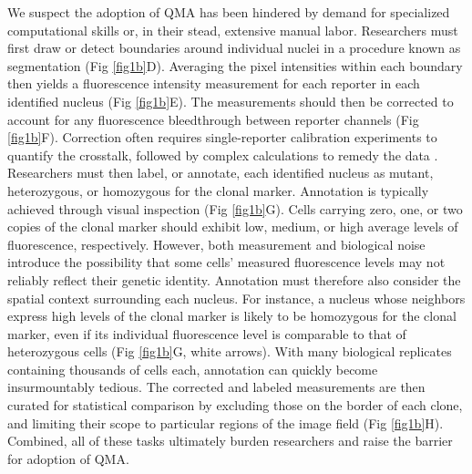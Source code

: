\documentclass[10pt,letterpaper]{article}
\begin{document}
We suspect the adoption of QMA has been hindered by demand for specialized computational skills or, in their stead, extensive manual labor. Researchers must first draw or detect boundaries around individual nuclei in a procedure known as segmentation (Fig \ref{fig1b}D). Averaging the pixel intensities within each boundary then yields a fluorescence intensity measurement for each reporter in each identified nucleus (Fig \ref{fig1b}E). The measurements should then be corrected to account for any fluorescence bleedthrough between reporter channels (Fig \ref{fig1b}F). Correction often requires single-reporter calibration experiments to quantify the crosstalk, followed by complex calculations to remedy the data \cite{Bacia2012,Elangovan2003}. Researchers must then label, or annotate, each identified nucleus as mutant, heterozygous, or homozygous for the clonal marker. Annotation is typically achieved through visual inspection (Fig \ref{fig1b}G). Cells carrying zero, one, or two copies of the clonal marker should exhibit low, medium, or high average levels of fluorescence, respectively. However, both measurement and biological noise introduce the possibility that some cells’ measured fluorescence levels may not reliably reflect their genetic identity. Annotation must therefore also consider the spatial context surrounding each nucleus. For instance, a nucleus whose neighbors express high levels of the clonal marker is likely to be homozygous for the clonal marker, even if its individual fluorescence level is comparable to that of heterozygous cells (Fig \ref{fig1b}G, white arrows). With many biological replicates containing thousands of cells each, annotation can quickly become insurmountably tedious. The corrected and labeled measurements are then curated for statistical comparison by excluding those on the border of each clone, and limiting their scope to particular regions of the image field (Fig \ref{fig1b}H). Combined, all of these tasks ultimately burden researchers and raise the barrier for adoption of QMA. 
\end{document}
